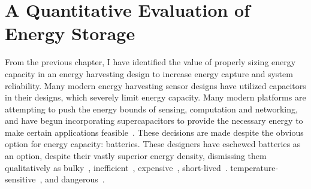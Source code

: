 \chapter{A Quantitative Evaluation of Energy Storage}
\label{chap:battery}

From the previous chapter, I have identified the value of properly sizing energy capacity in an energy harvesting design to increase energy capture and system reliability. 
Many modern energy harvesting sensor designs have utilized capacitors in their designs, which severely limit energy capacity.
Many modern platforms are attempting to push the energy bounds of sensing, computation and networking, and have begun incorporating supercapacitors to provide the necessary energy to make certain applications feasible~\cite{nardello2019camaroptera}.
These decisions are made despite the obvious option for energy capacity: batteries.
These designers have eschewed batteries as an option, despite their vastly superior energy density, dismissing them qualitatively as 
bulky~\cite{hesterNew17, hesterTragedy15, hesterFlicker17, hesterTimely17, yervaGrafting12, majid2020continuous},
inefficient~\cite{hesterNew17, hesterTragedy15, hesterFlicker17, hesterTimely17},
expensive~\cite{hesterNew17, hesterTragedy15, hesterFlicker17, hesterTimely17, majid2020continuous},
short-lived~\cite{hesterNew17, hesterTragedy15, hesterFlicker17, hesterTimely17, colinReconfigurable18, luciaIntermittent17, yervaGrafting12, majid2020continuous}.
temperature-sensitive~\cite{hesterNew17, hesterTragedy15, hesterFlicker17, hesterTimely17, colinReconfigurable18, luciaIntermittent17},
and dangerous~\cite{hesterNew17, hesterTragedy15, hesterFlicker17, hesterTimely17, majid2020continuous}. 

